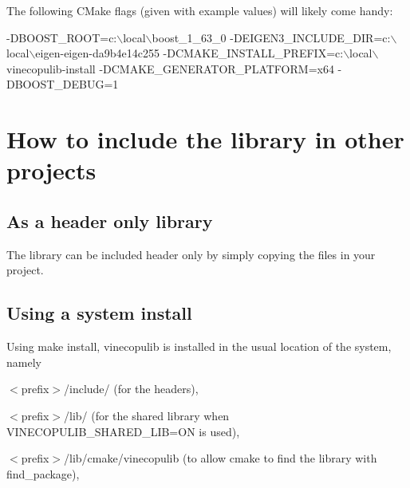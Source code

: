 The following C\+Make flags (given with example values) will likely come handy\+: 
\begin{DoxyCode}
-DBOOST\_ROOT=c:\(\backslash\)local\(\backslash\)boost\_1\_63\_0
-DEIGEN3\_INCLUDE\_DIR=c:\(\backslash\)local\(\backslash\)eigen-eigen-da9b4e14c255
-DCMAKE\_INSTALL\_PREFIX=c:\(\backslash\)local\(\backslash\)vinecopulib-install
-DCMAKE\_GENERATOR\_PLATFORM=x64
-DBOOST\_DEBUG=1
\end{DoxyCode}
\hypertarget{setup_include-lib}{}\section{How to include the library in other projects}\label{setup_include-lib}
\hypertarget{setup_include-headers}{}\subsection{As a header only library}\label{setup_include-headers}
The library can be included header only by simply copying the files in your project.\hypertarget{setup_include-install}{}\subsection{Using a system install}\label{setup_include-install}
Using {\ttfamily make install}, vinecopulib is installed in the usual location of the system, namely


\begin{DoxyItemize}
\item {\ttfamily $<$prefix$>$/include/} (for the headers),
\item {\ttfamily $<$prefix$>$/lib/} (for the shared library when {\ttfamily V\+I\+N\+E\+C\+O\+P\+U\+L\+I\+B\+\_\+\+S\+H\+A\+R\+E\+D\+\_\+\+L\+IB=ON} is used),
\item {\ttfamily $<$prefix$>$/lib/cmake/vinecopulib} (to allow cmake to find the library with {\ttfamily find\+\_\+package}),
\end{DoxyItemize}

